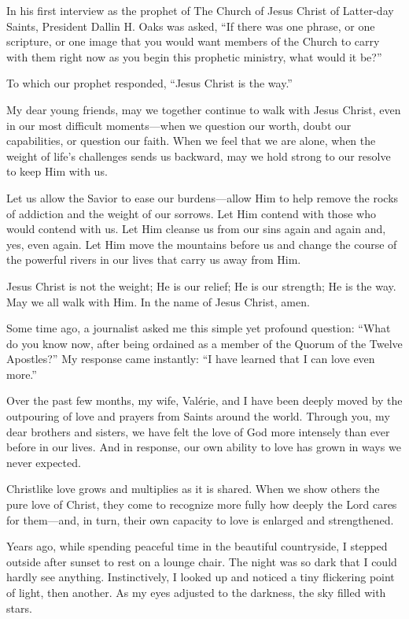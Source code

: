 \documentclass[letterpaper, 11pt]{report}
\newcommand{\speaker}{}
\newcommand{\talk}{}
\newcommand{\talkdatestr}{}
\newcommand{\setspeaker}[1]{\renewcommand{\speaker}{#1}}
\newcommand{\settalk}[1]{\renewcommand{\talk}{#1}}
\newcommand{\talkheading}[2]{%
    \vspace{1em}
    \noindent{\huge\bfseries #1}
    \par\nopagebreak\vspace{0.25em}
    \noindent{\normalsize\bfseries #2\ifx\talkdatestr\empty\else,\ \talkdatestr\fi}
    \par\nopagebreak\vspace{0.5em}
}
\begin{document}
In his first interview as the prophet of The Church of Jesus Christ of Latter-day Saints, President Dallin H. Oaks was asked, “If there was one phrase, or one scripture, or one image that you would want members of the Church to carry with them right now as you begin this prophetic ministry, what would it be?”

To which our prophet responded, “Jesus Christ is the way.”

My dear young friends, may we together continue to walk with Jesus Christ, even in our most difficult moments—when we question our worth, doubt our capabilities, or question our faith. When we feel that we are alone, when the weight of life’s challenges sends us backward, may we hold strong to our resolve to keep Him with us.

Let us allow the Savior to ease our burdens—allow Him to help remove the rocks of addiction and the weight of our sorrows. Let Him contend with those who would contend with us. Let Him cleanse us from our sins again and again and, yes, even again. Let Him move the mountains before us and change the course of the powerful rivers in our lives that carry us away from Him.

Jesus Christ is not the weight; He is our relief; He is our strength; He is the way. May we all walk with Him. In the name of Jesus Christ, amen.

\newpage
\settalk{Love All; Love Each}
\setspeaker{Gérald Caussé}
\talkheading{Love All; Love Each}{Gérald Caussé}

Some time ago, a journalist asked me this simple yet profound question: “What do you know now, after being ordained as a member of the Quorum of the Twelve Apostles?” My response came instantly: “I have learned that I can love even more.”

Over the past few months, my wife, Valérie, and I have been deeply moved by the outpouring of love and prayers from Saints around the world. Through you, my dear brothers and sisters, we have felt the love of God more intensely than ever before in our lives. And in response, our own ability to love has grown in ways we never expected.

Christlike love grows and multiplies as it is shared. When we show others the pure love of Christ, they come to recognize more fully how deeply the Lord cares for them—and, in turn, their own capacity to love is enlarged and strengthened.

Years ago, while spending peaceful time in the beautiful countryside, I stepped outside after sunset to rest on a lounge chair. The night was so dark that I could hardly see anything. Instinctively, I looked up and noticed a tiny flickering point of light, then another. As my eyes adjusted to the darkness, the sky filled with stars.
\end{document}
